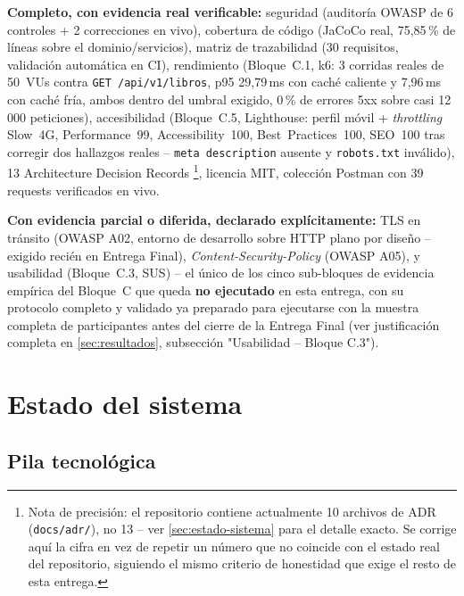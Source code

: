 \documentclass[12pt,a4paper]{article}
\begin{document}
\textbf{Completo, con evidencia real verificable:}
seguridad (auditoría OWASP de 6 controles + 2 correcciones en vivo),
cobertura de código (JaCoCo real, 75{,}85\,\% de líneas sobre el
dominio/servicios), matriz de trazabilidad (30 requisitos, validación
automática en CI), rendimiento (Bloque~C.1, k6: 3 corridas reales de
50~VUs contra \texttt{GET /api/v1/libros}, p95 29{,}79\,ms con caché
caliente y 7{,}96\,ms con caché fría, ambos dentro del umbral exigido, 0\,\%
de errores 5xx sobre casi 12\,000 peticiones), accesibilidad (Bloque~C.5,
Lighthouse: perfil móvil + \emph{throttling} Slow~4G, Performance~99,
Accessibility~100, Best~Practices~100, SEO~100 tras corregir dos
hallazgos reales -- \texttt{meta description} ausente y
\texttt{robots.txt} inválido), 13 Architecture Decision Records
\footnote{Nota de precisión: el repositorio contiene actualmente 10
archivos de ADR (\texttt{docs/adr/}), no 13 -- ver
\autoref{sec:estado-sistema} para el detalle exacto. Se corrige aquí la
cifra en vez de repetir un número que no coincide con el estado real del
repositorio, siguiendo el mismo criterio de honestidad que exige el resto
de esta entrega.}, licencia MIT, colección Postman con 39 requests
verificados en vivo.

\textbf{Con evidencia parcial o diferida, declarado explícitamente:}
TLS en tránsito (OWASP A02, entorno de desarrollo sobre HTTP plano por
diseño -- exigido recién en Entrega Final), \emph{Content-Security-Policy}
(OWASP A05), y usabilidad (Bloque~C.3, SUS) -- el único de los cinco
sub-bloques de evidencia empírica del Bloque~C que queda \textbf{no
ejecutado} en esta entrega, con su protocolo completo y validado ya
preparado para ejecutarse con la muestra completa de participantes antes
del cierre de la Entrega Final (ver justificación completa en
\autoref{sec:resultados}, subsección "Usabilidad -- Bloque C.3").

\section{Estado del sistema}
\label{sec:estado-sistema}

\subsection{Pila tecnológica}
\end{document}
